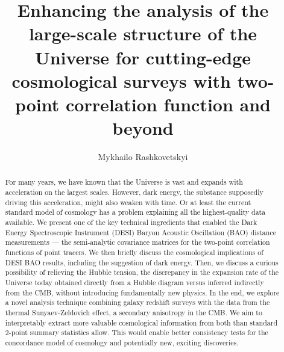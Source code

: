 \documentclass[11pt]{gsasthesis} %
\title{Enhancing the analysis of the large-scale structure of the Universe for cutting-edge cosmological surveys with two-point correlation function and beyond} %
\author{Mykhailo Rashkovetskyi} %
\begin{document}




\thesistitlepage
\copyrightpage
\begin{abstract}
For many years, we have known that the Universe is vast and expands with acceleration on the largest scales.
However, dark energy, the substance supposedly driving this acceleration, might also weaken with time.
Or at least the current standard model of cosmology has a problem explaining all the highest-quality data available.
We present one of the key technical ingredients that enabled the Dark Energy Spectroscopic Instrument (DESI) Baryon Acoustic Oscillation (BAO) distance measurements --- the semi-analytic covariance matrices for the two-point correlation functions of point tracers.
We then briefly discuss the cosmological implications of DESI BAO results, including the suggestion of dark energy.
Then, we discuss a curious possibility of relieving the Hubble tension, the discrepancy in the expansion rate of the Universe today obtained directly from a Hubble diagram versus inferred indirectly from the CMB, without introducing fundamentally new physics.
In the end, we explore a novel analysis technique combining galaxy redshift surveys with the data from the thermal Sunyaev-Zeldovich effect, a secondary anisotropy in the CMB.
We aim to interpretably extract more valuable cosmological information from both than standard 2-point summary statistics allow.
This would enable better consistency tests for the concordance model of cosmology and potentially new, exciting discoveries.
\end{abstract}

\renewcommand{\contentsname}{\protect\centering\protect\Large Table of Contents}
\renewcommand{\listtablename}{\protect\centering\protect\Large List of Tables}
\renewcommand{\listfigurename}{\protect\centering\protect\Large List of Figures}

\tableofcontents %
\end{document}
